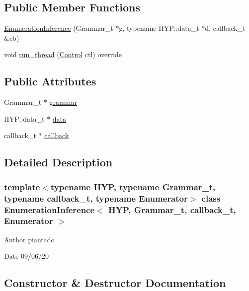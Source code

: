 \subsection*{Public Member Functions}
\begin{DoxyCompactItemize}
\item 
\hyperlink{class_enumeration_inference_a0726b90614680808bb5ac87ca440a683}{Enumeration\+Inference} (Grammar\+\_\+t $\ast$g, typename H\+Y\+P\+::data\+\_\+t $\ast$d, callback\+\_\+t \&cb)
\item 
void \hyperlink{class_enumeration_inference_a128e8af05312e3a4a537e90ceb45c5ba}{run\+\_\+thread} (\hyperlink{struct_control}{Control} ctl) override
\end{DoxyCompactItemize}
\subsection*{Public Attributes}
\begin{DoxyCompactItemize}
\item 
Grammar\+\_\+t $\ast$ \hyperlink{class_enumeration_inference_aa39598587ac2d15550f8f9c6ca0c7089}{grammar}
\item 
H\+Y\+P\+::data\+\_\+t $\ast$ \hyperlink{class_enumeration_inference_a04537935bdd05d4320a51b15ddbca015}{data}
\item 
callback\+\_\+t $\ast$ \hyperlink{class_enumeration_inference_a25d87b73385c434bdc34192b3408c0d0}{callback}
\end{DoxyCompactItemize}


\subsection{Detailed Description}
\subsubsection*{template$<$typename H\+YP, typename Grammar\+\_\+t, typename callback\+\_\+t, typename Enumerator$>$\newline
class Enumeration\+Inference$<$ H\+Y\+P, Grammar\+\_\+t, callback\+\_\+t, Enumerator $>$}

\begin{DoxyAuthor}{Author}
piantado 
\end{DoxyAuthor}
\begin{DoxyDate}{Date}
09/06/20 
\end{DoxyDate}


\subsection{Constructor \& Destructor Documentation}
\mbox{\label{class_enumeration_inference_a0726b90614680808bb5ac87ca440a683}} 
